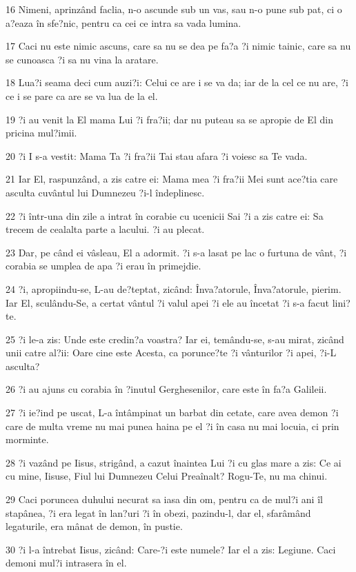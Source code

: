 \par 16 Nimeni, aprinzând faclia, n-o ascunde sub un vas, sau n-o pune sub pat, ci o a?eaza în sfe?nic, pentru ca cei ce intra sa vada lumina.
\par 17 Caci nu este nimic ascuns, care sa nu se dea pe fa?a ?i nimic tainic, care sa nu se cunoasca ?i sa nu vina la aratare.
\par 18 Lua?i seama deci cum auzi?i: Celui ce are i se va da; iar de la cel ce nu are, ?i ce i se pare ca are se va lua de la el.
\par 19 ?i au venit la El mama Lui ?i fra?ii; dar nu puteau sa se apropie de El din pricina mul?imii.
\par 20 ?i I s-a vestit: Mama Ta ?i fra?ii Tai stau afara ?i voiesc sa Te vada.
\par 21 Iar El, raspunzând, a zis catre ei: Mama mea ?i fra?ii Mei sunt ace?tia care asculta cuvântul lui Dumnezeu ?i-l îndeplinesc.
\par 22 ?i într-una din zile a intrat în corabie cu ucenicii Sai ?i a zis catre ei: Sa trecem de cealalta parte a lacului. ?i au plecat.
\par 23 Dar, pe când ei vâsleau, El a adormit. ?i s-a lasat pe lac o furtuna de vânt, ?i corabia se umplea de apa ?i erau în primejdie.
\par 24 ?i, apropiindu-se, L-au de?teptat, zicând: Înva?atorule, Înva?atorule, pierim. Iar El, sculându-Se, a certat vântul ?i valul apei ?i ele au încetat ?i s-a facut lini?te.
\par 25 ?i le-a zis: Unde este credin?a voastra? Iar ei, temându-se, s-au mirat, zicând unii catre al?ii: Oare cine este Acesta, ca porunce?te ?i vânturilor ?i apei, ?i-L asculta?
\par 26 ?i au ajuns cu corabia în ?inutul Gerghesenilor, care este în fa?a Galileii.
\par 27 ?i ie?ind pe uscat, L-a întâmpinat un barbat din cetate, care avea demon ?i care de multa vreme nu mai punea haina pe el ?i în casa nu mai locuia, ci prin morminte.
\par 28 ?i vazând pe Iisus, strigând, a cazut înaintea Lui ?i cu glas mare a zis: Ce ai cu mine, Iisuse, Fiul lui Dumnezeu Celui Preaînalt? Rogu-Te, nu ma chinui.
\par 29 Caci poruncea duhului necurat sa iasa din om, pentru ca de mul?i ani îl stapânea, ?i era legat în lan?uri ?i în obezi, pazindu-l, dar el, sfarâmând legaturile, era mânat de demon, în pustie.
\par 30 ?i l-a întrebat Iisus, zicând: Care-?i este numele? Iar el a zis: Legiune. Caci demoni mul?i intrasera în el.
